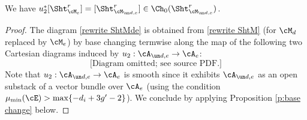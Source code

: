 \begin{lemma}
\notready\label{l:u2}
We have $u_{2}^{*}[\Sht^{r}_{\cM_{e}}]=[\Sht^{r}_{\cM_{\un d,e}}]\in \Ch_{0}(\Sht^{r}_{\cM_{\un d,e}})
$.
\end{lemma}
\begin{proof}
The diagram \eqref{rewrite ShtMde} is obtained from \eqref{rewrite ShtM} (for $\cM_{d}$ replaced by $\cM_{e}$) by base changing termwise along the map of the following two Cartesian diagrams induced by $u_{2}: \cA_{\un d,e}\to \cA_{e}$:
\begin{equation}
\text{[Diagram omitted; see source PDF.]}
\end{equation}
Note that $u_{2}: \cA_{\un d,e}\to \cA_{e}$ is smooth since it exhibits $\cA_{\un d,e}$ as an open substack of a vector bundle over $\cA_{e}$ (using the condition $\mu_{\min}(\cE)>\max\{-d_{i}+3g'-2\}$). We conclude by applying Proposition \ref{p:base change} below.
\end{proof}



